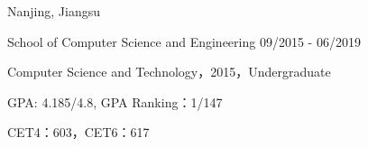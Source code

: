 \vspace{-7.0mm}

\begin{cventries}
\vspace{-1.5mm}
\cveducation
{}
{Nanjing, Jiangsu}

\cvsubeducation
{School of Computer Science and Engineering}
{09/2015 - 06/2019}
{
    \begin{cvitems}
    \item {Computer Science and Technology，2015，Undergraduate}
    \item {GPA: 4.185/4.8, GPA Ranking：1/147}
    \item{CET4：603，CET6：617}
    \end{cvitems}
}

\end{cventries}